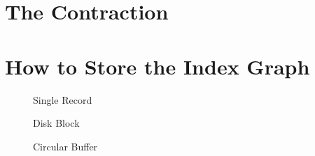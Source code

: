 \section{The Contraction}

\section{How to Store the Index Graph}

\begin{figure}
    \centering
    
    \caption{Single Record}
    \label{fig:singleRecord}
\end{figure}

\begin{figure}
    \centering
    
    \caption{Disk Block}
    \label{fig:disk_block}
\end{figure}

\begin{figure}
    \centering
    
    \caption{Circular Buffer}
    \label{fig:circular_buffer}
\end{figure}
